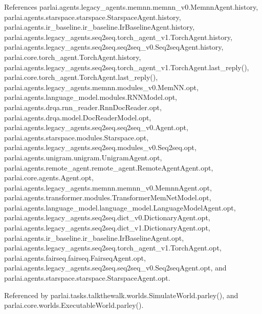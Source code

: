 References parlai.\+agents.\+legacy\+\_\+agents.\+memnn.\+memnn\+\_\+v0.\+Memnn\+Agent.\+history, parlai.\+agents.\+starspace.\+starspace.\+Starspace\+Agent.\+history, parlai.\+agents.\+ir\+\_\+baseline.\+ir\+\_\+baseline.\+Ir\+Baseline\+Agent.\+history, parlai.\+agents.\+legacy\+\_\+agents.\+seq2seq.\+torch\+\_\+agent\+\_\+v1.\+Torch\+Agent.\+history, parlai.\+agents.\+legacy\+\_\+agents.\+seq2seq.\+seq2seq\+\_\+v0.\+Seq2seq\+Agent.\+history, parlai.\+core.\+torch\+\_\+agent.\+Torch\+Agent.\+history, parlai.\+agents.\+legacy\+\_\+agents.\+seq2seq.\+torch\+\_\+agent\+\_\+v1.\+Torch\+Agent.\+last\+\_\+reply(), parlai.\+core.\+torch\+\_\+agent.\+Torch\+Agent.\+last\+\_\+reply(), parlai.\+agents.\+legacy\+\_\+agents.\+memnn.\+modules\+\_\+v0.\+Mem\+N\+N.\+opt, parlai.\+agents.\+language\+\_\+model.\+modules.\+R\+N\+N\+Model.\+opt, parlai.\+agents.\+drqa.\+rnn\+\_\+reader.\+Rnn\+Doc\+Reader.\+opt, parlai.\+agents.\+drqa.\+model.\+Doc\+Reader\+Model.\+opt, parlai.\+agents.\+legacy\+\_\+agents.\+seq2seq.\+seq2seq\+\_\+v0.\+Agent.\+opt, parlai.\+agents.\+starspace.\+modules.\+Starspace.\+opt, parlai.\+agents.\+legacy\+\_\+agents.\+seq2seq.\+modules\+\_\+v0.\+Seq2seq.\+opt, parlai.\+agents.\+unigram.\+unigram.\+Unigram\+Agent.\+opt, parlai.\+agents.\+remote\+\_\+agent.\+remote\+\_\+agent.\+Remote\+Agent\+Agent.\+opt, parlai.\+core.\+agents.\+Agent.\+opt, parlai.\+agents.\+legacy\+\_\+agents.\+memnn.\+memnn\+\_\+v0.\+Memnn\+Agent.\+opt, parlai.\+agents.\+transformer.\+modules.\+Transformer\+Mem\+Net\+Model.\+opt, parlai.\+agents.\+language\+\_\+model.\+language\+\_\+model.\+Language\+Model\+Agent.\+opt, parlai.\+agents.\+legacy\+\_\+agents.\+seq2seq.\+dict\+\_\+v0.\+Dictionary\+Agent.\+opt, parlai.\+agents.\+legacy\+\_\+agents.\+seq2seq.\+dict\+\_\+v1.\+Dictionary\+Agent.\+opt, parlai.\+agents.\+ir\+\_\+baseline.\+ir\+\_\+baseline.\+Ir\+Baseline\+Agent.\+opt, parlai.\+agents.\+legacy\+\_\+agents.\+seq2seq.\+torch\+\_\+agent\+\_\+v1.\+Torch\+Agent.\+opt, parlai.\+agents.\+fairseq.\+fairseq.\+Fairseq\+Agent.\+opt, parlai.\+agents.\+legacy\+\_\+agents.\+seq2seq.\+seq2seq\+\_\+v0.\+Seq2seq\+Agent.\+opt, and parlai.\+agents.\+starspace.\+starspace.\+Starspace\+Agent.\+opt.



Referenced by parlai.\+tasks.\+talkthewalk.\+worlds.\+Simulate\+World.\+parley(), and parlai.\+core.\+worlds.\+Executable\+World.\+parley().


